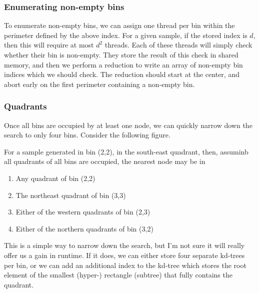 \subsubsection{Enumerating non-empty bins}

To enumerate non-empty bins, we can assign one thread per bin within the perimeter defined by the above index. For a given sample, if the stored index is $d$, then this will require at most $d^2$ threads. Each of these threads will simply check whether their bin is non-empty. They store the result of this check in shared memory, and then we perform a reduction to write an array of non-empty bin indices which we should check. The reduction should start at the center, and abort early on the first perimeter containing
 a non-empty bin.


\subsubsection{Quadrants}

Once all bins are occupied by at least one node, we can quickly narrow down the search to only four bins. Consider the following figure.

\begin{figure}[H]
\begin{centering}
    \texttt{[image: \\figfile\{fig/nonempty\_full\_quad]}}
    \caption{Quandrants}
\end{centering} 
\end{figure}

For a sample generated in bin (2,2), in the south-east quadrant, then, assuminb all quadrants of all bins are occupied, the nearest node may be in 

\begin{enumerate}
    \item Any quadrant of bin (2,2)
    \item The northeast quadrant of bin (3,3)
    \item Either of the western quadrants of bin (2,3)
    \item Either of the northern quadrants of bin (3,2)
\end{enumerate}

This is a simple way to narrow down the search, but I'm not sure it will really offer us a gain in runtime. If it does, we can either store four separate kd-trees per bin, or we can add an additional index to the kd-tree which stores the root element of the smallest (hyper-) rectangle (subtree) that fully contains the quadrant.


